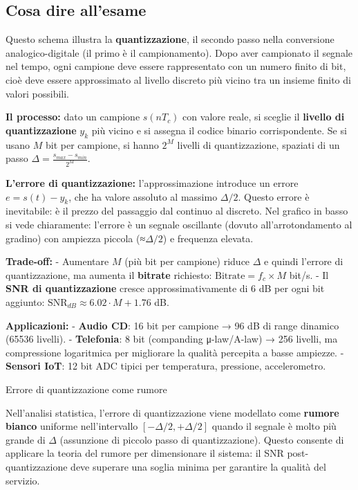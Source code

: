 \documentclass[
  italian,
  openany]{book}
\begin{document}
\subsection{Cosa dire all'esame}\label{cosa-dire-allesame-17}

Questo schema illustra la \textbf{quantizzazione}, il secondo passo
nella conversione analogico-digitale (il primo è il campionamento). Dopo
aver campionato il segnale nel tempo, ogni campione deve essere
rappresentato con un numero finito di bit, cioè deve essere approssimato
al livello discreto più vicino tra un insieme finito di valori
possibili.

\textbf{Il processo:} dato un campione \(s(nT_c)\) con valore reale, si
sceglie il \textbf{livello di quantizzazione} \(y_k\) più vicino e si
assegna il codice binario corrispondente. Se si usano \(M\) bit per
campione, si hanno \(2^M\) livelli di quantizzazione, spaziati di un
passo \(\Delta = \frac{s_{max} - s_{min}}{2^M}\).

\textbf{L'errore di quantizzazione:} l'approssimazione introduce un
errore \(e = s(t) - y_k\), che ha valore assoluto al massimo
\(\Delta/2\). Questo errore è inevitabile: è il prezzo del passaggio dal
continuo al discreto. Nel grafico in basso si vede chiaramente: l'errore
è un segnale oscillante (dovuto all'arrotondamento al gradino) con
ampiezza piccola (≈\(\Delta/2\)) e frequenza elevata.

\textbf{Trade-off:} - Aumentare \(M\) (più bit per campione) riduce
\(\Delta\) e quindi l'errore di quantizzazione, ma aumenta il
\textbf{bitrate} richiesto: \(\text{Bitrate} = f_c \times M\) bit/s. -
Il \textbf{SNR di quantizzazione} cresce approssimativamente di 6 dB per
ogni bit aggiunto: \(\text{SNR}_{dB} \approx 6.02 \cdot M + 1.76\) dB.

\textbf{Applicazioni:} - \textbf{Audio CD}: 16 bit per campione → 96 dB
di range dinamico (65536 livelli). - \textbf{Telefonia}: 8 bit
(companding μ-law/A-law) → 256 livelli, ma compressione logaritmica per
migliorare la qualità percepita a basse ampiezze. - \textbf{Sensori
IoT}: 12 bit ADC tipici per temperatura, pressione, accelerometro.

\begin{calloutnote}{Errore di quantizzazione come rumore}

Nell'analisi statistica, l'errore di quantizzazione viene modellato come
\textbf{rumore bianco} uniforme nell'intervallo
\([-\Delta/2, +\Delta/2]\) quando il segnale è molto più grande di
\(\Delta\) (assunzione di piccolo passo di quantizzazione). Questo
consente di applicare la teoria del rumore per dimensionare il sistema:
il SNR post-quantizzazione deve superare una soglia minima per garantire
la qualità del servizio.

\end{calloutnote}
\end{document}
